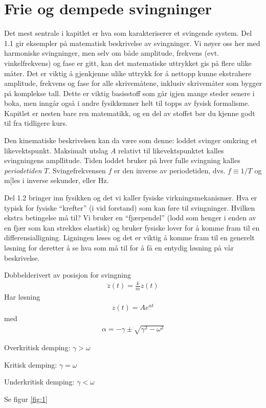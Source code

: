 \documentclass[12pt]{article}
\numberwithin{equation}{section}
\numberwithin{figure}{section}
\newcommand{\ita}[1]{\textit{#1}}
\newcommand{\ma}[1]{$#1$}
\newcommand{\eq}[1]{{\small\begin{align}#1\end{align}}}
\begin{document}
\section{Frie og dempede svingninger}
\label{sec:1}
  
Det mest sentrale i kapitlet er hva som karakteriserer et svingende system. Del 1.1 gir eksempler på matematisk beskrivelse av svingninger. Vi nøyer oss her med harmoniske svingninger, men selv om både amplitude, frekvens (evt. vinkelfrekvens) og fase er gitt, kan det matematiske uttrykket gis på flere ulike måter. Det er viktig å gjenkjenne ulike uttrykk for å nettopp kunne ekstrahere amplitude, frekvens og fase for alle skrivemåtene, inklusiv skrivemåter som bygger på komplekse tall. Dette er viktig basisstoff som går igjen  mange steder senere i boka, men inngår også i andre fysikkemner helt til topps av fysisk formalisme. Kapitlet er nesten bare ren matematikk, og en del av stoffet bør du kjenne godt til fra tidligere kurs.


\begin{tcolorbox}[title = Del 1.1 -- Kinematikk,breakable]
  Den kinematiske beskrivelsen kan da være som denne: loddet svinger omkring et 
  likevektspunkt. Maksimalt utslag \ma A relativt til likevektspunktet kalles svingningens
  ampllitude. Tiden loddet bruker på hver fulle svingning kalles \ita{periodetiden} $T$.
  Svingefrekvensen \ma f er den inverse av periodetiden, dvs. \ma{f\equiv 1/T} og 
  m[les i inverse sekunder, eller Hz.
\end{tcolorbox}

Del 1.2 bringer inn fysikken og det vi kaller fysiske virkningsmekanismer. Hva er typisk for fysiske “krefter” (i vid forstand) som kan føre til svingninger. Hvilken ekstra betingelse må til? Vi bruker en “fjærpendel” (lodd som henger i enden av en fjær som kan strekkes elastisk) og bruker fysiske lover for å komme fram til en differensialligning. Ligningen løses og det er viktig å komme fram til en generelt løsning for deretter å se hva som må til for å få en entydig løsning på vår beskrivelse.

\begin{tcolorbox}[title = Del 1.2 --  Dynamisk beskrivelse av et mekanisk system,breakable]
Dobbelderivert av posisjon for svingning
  \eq{\ddot z(t) = \frac{k}{m}z(t)}
  Har løsning
  \eq{z(t) = A e^{\alpha t}}
  med \eq{\alpha = -\gamma \pm \sqrt{\gamma^2-\omega^2}}
  
  Overkritisk demping: $\gamma > \omega$
  
  Kritisk demping: $\gamma = \omega$
  
  Underkritisk demping: $\gamma < \omega$
  
  Se figur \ref{fig:1}
\end{tcolorbox}
\end{document}
